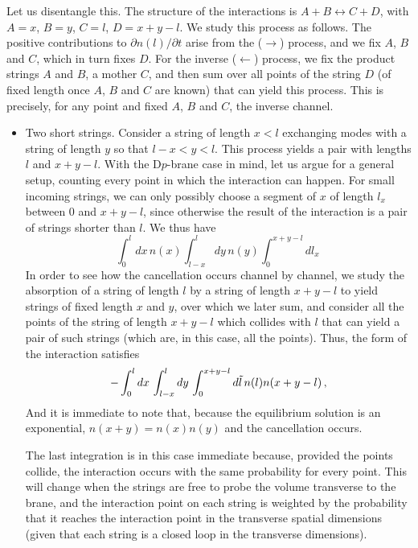 \documentclass[a4paper,11pt]{article}
\begin{document}
Let us disentangle this. 
The structure of the interactions is $A+B\leftrightarrow C+D$, with $A=x$, $B=y$, $C=l$, $D=x+y-l$.
We study this process as follows.
The positive contributions to $\partial n(l)/\partial t$ arise from the ($\rightarrow$) process, and we fix $A$, $B$ and $C$, which in turn fixes $D$.
For the inverse ($\leftarrow$) process, we fix the product strings $A$ and $B$, a mother $C$, and then sum over all points of the string $D$ (of fixed length once $A$, $B$ and $C$ are known) that can yield this process. 
This is precisely, for any point and fixed $A$, $B$ and $C$, the inverse channel.
\begin{itemize}
    \item Two short strings.
    Consider a string of length $x<l$ exchanging modes with a string of length $y$ so that $l-x<y<l$.
    This process yields a pair with lengths $l$ and $x+y-l$.
    With the D$p$-brane case in mind, let us argue for a general setup, counting every point in which the interaction can happen.
    For small incoming strings, we can only possibly choose a segment of $x$ of length $l_x$ between $0$ and $x+y-l$, since otherwise the result of the interaction is a pair of strings shorter than $l$.
    We thus have
    \begin{equation}
        \int_0^l{dx\, n(x) \int_{l-x}^{l}{dy\, n(y) \int_0^{x+y-l}{dl_x}}}\, 
    \end{equation}
    In order to see how the cancellation occurs channel by channel, we study the absorption of a string of length $l$ by a string of length $x+y-l$ to yield strings of fixed length $x$ and $y$, over which we later sum, and consider all the points of the string of length $x+y-l$ which collides with $l$ that can yield a pair of such strings (which are, in this case, all the points). 
    Thus, the form of the interaction satisfies
    \begin{equation}\label{eq:short2-2}
        -\int_0^l{dx\, \int_{l-x}^l{dy\, \int_0^{x+y-l}{d\Tilde{l}\, n(l)n(x+y-l)}}}\, ,
    \end{equation}
    And it is immediate to note that, because the equilibrium solution is an exponential, $n(x+y)=n(x)n(y)$ and the cancellation occurs.

    The last integration is in this case immediate because, provided the points collide, the interaction occurs with the same probability for every point.
    This will change when the strings are free to probe the volume transverse to the brane, and the interaction point on each string is weighted by
    the probability that it reaches the interaction point in the transverse spatial dimensions (given that each string is a closed loop in the transverse dimensions).


\end{itemize}
\end{document}
